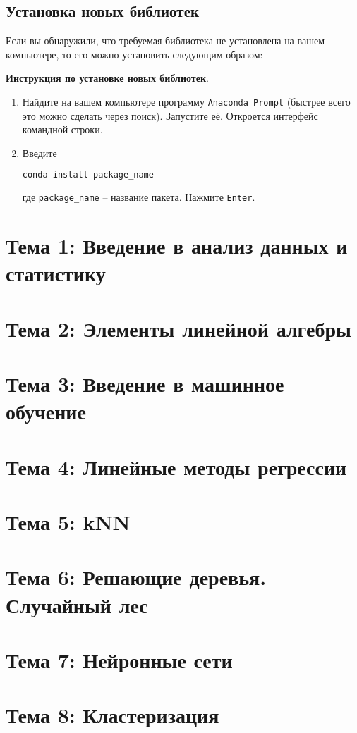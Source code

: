 \documentclass[11pt, a4paper]{extarticle}
\begin{document}
	\subsection{Установка новых библиотек}
	Если вы обнаружили, что требуемая библиотека не установлена на вашем компьютере, то его можно установить следующим образом:
	\begin{shaded}
		\textbf{Инструкция по установке новых библиотек}.
		\begin{enumerate}
			\item Найдите на вашем компьютере программу \lstinline|Anaconda Prompt| (быстрее всего это можно сделать через поиск).
			Запустите её.
			Откроется интерфейс командной строки.
			\item Введите
			\begin{lstlisting}[language=bash]
				conda install package_name
			\end{lstlisting}
			где \lstinline|package_name| -- название пакета.
			Нажмите \lstinline|Enter|.
		\end{enumerate}
	\end{shaded}
	
	
	\section{Тема 1: Введение в анализ данных и статистику}
	
	\section{Тема 2: Элементы линейной алгебры}
	
	\section{Тема 3: Введение в машинное обучение}
	
	\section{Тема 4: Линейные методы регрессии}
	
	\section{Тема 5: kNN}
	
	\section{Тема 6: Решающие деревья. Случайный лес}
	
	\section{Тема 7: Нейронные сети}
	
	\section{Тема 8: Кластеризация}
	
\end{document}
